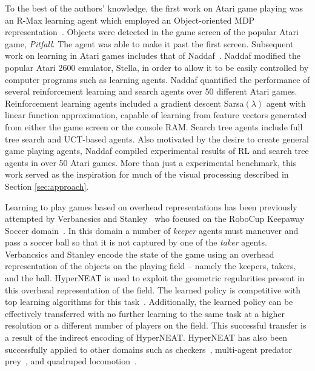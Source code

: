 \documentclass{sig-alternate}
\begin{document}
To the best of the authors' knowledge, the first work on Atari game playing was an R-Max learning agent which employed an Object-oriented MDP representation~\cite{duik08}. Objects were detected in the game screen of the popular Atari game, \emph{Pitfall}. The agent was able to make it past the first screen. Subsequent work on learning in Atari games includes that of Naddaf~\cite{naddaf10}. Naddaf modified the popular Atari 2600 emulator, Stella, in order to allow it to be easily controlled by computer programs such as learning agents. Naddaf quantified the performance of several reinforcement learning and search agents over 50 different Atari games. Reinforcement learning agents included a gradient descent Sarsa$(\lambda)$ agent with linear function approximation, capable of learning from feature vectors generated from either the game screen or the console RAM. Search tree agents include full tree search and UCT-based agents. Also motivated by the desire to create general game playing agents, Naddaf compiled experimental results of RL and search tree agents in over 50 Atari games. More than just a experimental benchmark, this work served as the inspiration for much of the visual processing described in Section \ref{sec:approach}.

Learning to play games based on overhead representations has been previously attempted by Verbancsics and Stanley~\cite{verbancsics10} who focused on the RoboCup Keepaway Soccer domain~\cite{stone01}. In this domain a number of \textit{keeper} agents must maneuver and pass a soccer ball so that it is not captured by one of the \textit{taker} agents. Verbancsics and Stanley encode the state of the game using an overhead representation of the objects on the playing field -- namely the keepers, takers, and the ball. HyperNEAT is used to exploit the geometric regularities present in this overhead representation of the field.  The learned policy is competitive with top learning algorithms for this task~\cite{stone05}. Additionally, the learned policy can be effectively transferred with no further learning to the same task at a higher resolution or a different number of players on the field. This successful transfer is a result of the indirect encoding of HyperNEAT. HyperNEAT has also been successfully applied to other domains such as checkers~\cite{gauci08}, multi-agent predator prey~\cite{ambrosio08}, and quadruped locomotion~\cite{clune09}. 
\end{document}
